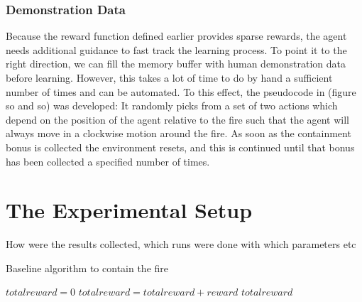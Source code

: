 \subsubsection{Demonstration Data}\label{sec:demo_data}
Because the reward function defined earlier provides sparse rewards, the agent needs additional guidance to fast track the learning process. To point it to the right direction, we can fill the memory buffer with human demonstration data before learning. However, this takes a lot of time to do by hand a sufficient number of times and can be automated. To this effect, the pseudocode in (figure so and so) was developed: It randomly picks from a set of two actions which depend on the position of the agent relative to the fire such that the agent will always move in a clockwise motion around the fire. As soon as the containment bonus is collected the environment resets, and this is continued until that bonus has been collected a specified number of times.

\section{The Experimental Setup}\label{sec:experiment}
How were the results collected, which runs were done with which parameters etc

\begin{algorithm}
  \caption{Baseline algorithm to contain the fire}
  \label{baseline_algo}
  \begin{algorithmic}[1]
    \State $totalreward = 0$
    \EndIf
    \State $totalreward = totalreward + reward$
    \EndWhile
    \State \Return $totalreward$
    \EndProcedure
  \end{algorithmic}
\end{algorithm}
